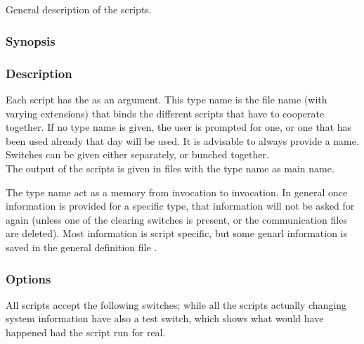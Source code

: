 
\subsection{}

General description of the  scripts.

\subsubsection*{Synopsis}

\begin{synopsis}
\end{synopsis}

\subsubsection*{Description}

\noindent
Each script has the {\em <type name>} as an argument. This type name is the
file name (with varying extensions) that binds the different scripts that
have to cooperate together. If no type name is given, the user is prompted for
one, or one that has been used already that day will be used. It is advisable
to always provide a name.\\
Switches can be given either separately, or bunched together.\\
The output of the scripts is given in files with the type name as main name.

\noindent
The type name act as a memory from invocation to invocation. In general once
information is provided for a specific type, that information will not be
asked for again (unless one of the clearing switches is present, or the
communication files are deleted). Most information is script specific, but
some genarl information is saved in the general definition file .

\subsubsection*{Options}

\noindent
All scripts accept the following switches; while all the scripts actually
changing system information have also a  test switch, which shows
what would have happened had the script run for real.

